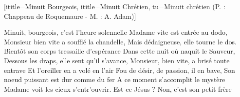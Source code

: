  [ititle={Minuit Bourgeois}, ititle={Minuit Chrétien}, tu={Minuit chrétien (P. : Chappeau de Roquemaure - M. : A. Adam)}]

\beginverse
Minuit, bourgeois, c'est l'heure solennelle
Madame vite est entrée au dodo,
Monsieur bien vite a soufflé la chandelle,
Mais dédaigneuse, elle tourne le dos.
Bientôt son corps tressaille d'espérance
Dans cette nuit où naquit le Sauveur,
Dessous les draps, elle sent qu'il s'avance,
\endverse
\beginverse
Monsieur, bien vite, a brisé toute entrave
Et l'oreiller en a volé en l'air
Fou de désir, de passion, il en bave,
Son noeud puissant est dur comme du fer
A ce moment s'accomplit le mystère
Madame voit les cieux s'entr'ouvrir.
Est-ce Jésus ? Non, c'est son petit frère
\endverse
\endsong

